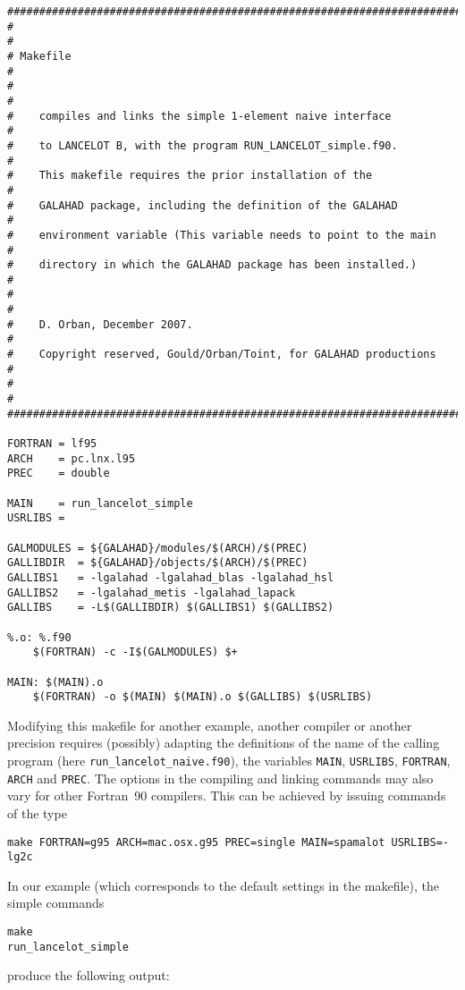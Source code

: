 \documentclass{article}
\begin{document}
\begin{lstlisting}[style=cshstyle]
########################################################################
#                                                                      #
# Makefile                                                             #
#                                                                      #
#    compiles and links the simple 1-element naive interface           #
#    to LANCELOT B, with the program RUN_LANCELOT_simple.f90.          #
#    This makefile requires the prior installation of the              #
#    GALAHAD package, including the definition of the GALAHAD          #
#    environment variable (This variable needs to point to the main    #
#    directory in which the GALAHAD package has been installed.)       #
#                                                                      #
#    D. Orban, December 2007.                                          #
#    Copyright reserved, Gould/Orban/Toint, for GALAHAD productions    #
#                                                                      #
########################################################################

FORTRAN = lf95
ARCH    = pc.lnx.l95
PREC    = double

MAIN    = run_lancelot_simple
USRLIBS =

GALMODULES = ${GALAHAD}/modules/$(ARCH)/$(PREC)
GALLIBDIR  = ${GALAHAD}/objects/$(ARCH)/$(PREC)
GALLIBS1   = -lgalahad -lgalahad_blas -lgalahad_hsl
GALLIBS2   = -lgalahad_metis -lgalahad_lapack
GALLIBS    = -L$(GALLIBDIR) $(GALLIBS1) $(GALLIBS2)

%.o: %.f90
	$(FORTRAN) -c -I$(GALMODULES) $+

MAIN: $(MAIN).o
	$(FORTRAN) -o $(MAIN) $(MAIN).o $(GALLIBS) $(USRLIBS)
\end{lstlisting}

\noindent
Modifying this makefile for another example, another compiler or another
precision requires (possibly) adapting the definitions of the name of the
calling program (here {\tt run\_lancelot\_naive.f90}), the variables
{\tt MAIN}, {\tt USRLIBS}, {\tt FORTRAN}, {\tt ARCH} and {\tt PREC}.
The options in the compiling and linking commands may also vary for other
Fortran~90 compilers. This can be achieved by issuing commands of the type
\begin{lstlisting}
make FORTRAN=g95 ARCH=mac.osx.g95 PREC=single MAIN=spamalot USRLIBS=-lg2c
\end{lstlisting}
In our example (which corresponds to the default settings in the makefile),
the simple commands
\begin{lstlisting}
make
run_lancelot_simple
\end{lstlisting}
produce the following output:
\end{document}
